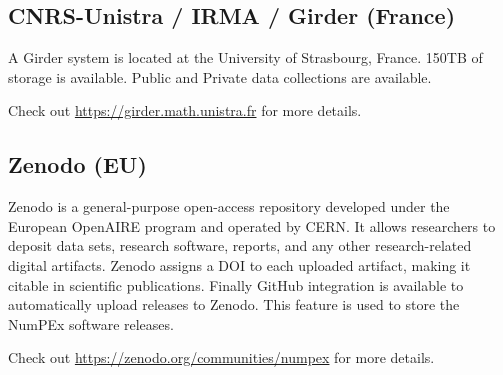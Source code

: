 \subsection*{CNRS-Unistra / IRMA / Girder (France)}
\label{sec:arch:girder:unistra}

A Girder system is located at the University of Strasbourg, France.
150TB of storage is available.
Public and Private data collections are available.

Check out \url{https://girder.math.unistra.fr} for more details.

\subsection*{Zenodo (EU)}
\label{sec:arch:zenodo}

Zenodo is a general-purpose open-access repository developed under the European OpenAIRE program and operated by CERN. 
It allows researchers to deposit data sets, research software, reports, and any other research-related digital artifacts. 
Zenodo assigns a DOI to each uploaded artifact, making it citable in scientific publications.
Finally GitHub integration is available to automatically upload releases to Zenodo. 
This feature is used to store the NumPEx software releases.

Check out \url{https://zenodo.org/communities/numpex} for more details.


